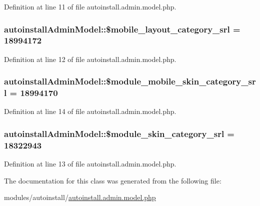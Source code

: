 Definition at line 11 of file autoinstall.\-admin.\-model.\-php.

\hypertarget{classautoinstallAdminModel_a7dca62f2e0f3e37c6f2562125cd8cf94}{
\subsubsection[{\$mobile\-\_\-layout\-\_\-category\-\_\-srl}]{\setlength{\rightskip}{0pt plus 5cm}autoinstall\-Admin\-Model\-::\$mobile\-\_\-layout\-\_\-category\-\_\-srl = 18994172}}\label{classautoinstallAdminModel_a7dca62f2e0f3e37c6f2562125cd8cf94}


Definition at line 12 of file autoinstall.\-admin.\-model.\-php.

\hypertarget{classautoinstallAdminModel_add26efaa0308b61db15daa951bef678f}{
\subsubsection[{\$module\-\_\-mobile\-\_\-skin\-\_\-category\-\_\-srl}]{\setlength{\rightskip}{0pt plus 5cm}autoinstall\-Admin\-Model\-::\$module\-\_\-mobile\-\_\-skin\-\_\-category\-\_\-srl = 18994170}}\label{classautoinstallAdminModel_add26efaa0308b61db15daa951bef678f}


Definition at line 14 of file autoinstall.\-admin.\-model.\-php.

\hypertarget{classautoinstallAdminModel_ad9e023f5b4f464ba2cbea5465d05ef69}{
\subsubsection[{\$module\-\_\-skin\-\_\-category\-\_\-srl}]{\setlength{\rightskip}{0pt plus 5cm}autoinstall\-Admin\-Model\-::\$module\-\_\-skin\-\_\-category\-\_\-srl = 18322943}}\label{classautoinstallAdminModel_ad9e023f5b4f464ba2cbea5465d05ef69}


Definition at line 13 of file autoinstall.\-admin.\-model.\-php.



The documentation for this class was generated from the following file\-:\begin{DoxyCompactItemize}
\item 
modules/autoinstall/\hyperlink{autoinstall_8admin_8model_8php}{autoinstall.\-admin.\-model.\-php}\end{DoxyCompactItemize}
